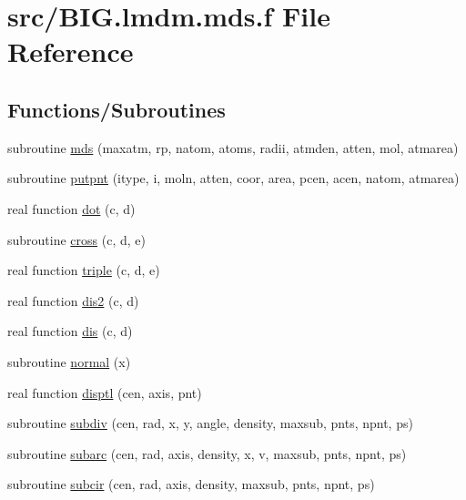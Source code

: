 \hypertarget{_b_i_g_8lmdm_8mds_8f}{}\section{src/\+B\+I\+G.lmdm.\+mds.\+f File Reference}
\label{_b_i_g_8lmdm_8mds_8f}
\subsection*{Functions/\+Subroutines}
\begin{DoxyCompactItemize}
\item 
subroutine \hyperlink{_b_i_g_8lmdm_8mds_8f_aa81f9e2405716814317f319fe16aabf3}{mds} (maxatm, rp, natom, atoms, radii, atmden, atten, mol, atmarea)
\item 
subroutine \hyperlink{_b_i_g_8lmdm_8mds_8f_abe5d23f06aa6cacf4afa05316bab2b62}{putpnt} (itype, i, moln, atten, coor, area, pcen, acen, natom, atmarea)
\item 
real function \hyperlink{_b_i_g_8lmdm_8mds_8f_ae601373f8acae350412756b81d7274c6}{dot} (c, d)
\item 
subroutine \hyperlink{_b_i_g_8lmdm_8mds_8f_ac8fc253e71c54239b8fdeca12294dc5c}{cross} (c, d, e)
\item 
real function \hyperlink{_b_i_g_8lmdm_8mds_8f_a4f0dc28bb4bc5945b250816796a6393c}{triple} (c, d, e)
\item 
real function \hyperlink{_b_i_g_8lmdm_8mds_8f_a0bbe4edf805497daf7eb55647f0e5463}{dis2} (c, d)
\item 
real function \hyperlink{_b_i_g_8lmdm_8mds_8f_a01231839cc4a4124a635ad9d120126a6}{dis} (c, d)
\item 
subroutine \hyperlink{_b_i_g_8lmdm_8mds_8f_a104a2973a06ccc713e06d9f6cb97874e}{normal} (x)
\item 
real function \hyperlink{_b_i_g_8lmdm_8mds_8f_a4e9fa2843ce6a1ff87a65c5b8e014c60}{disptl} (cen, axis, pnt)
\item 
subroutine \hyperlink{_b_i_g_8lmdm_8mds_8f_aede2b2a740b771fe587f556209c97414}{subdiv} (cen, rad, x, y, angle, density, maxsub, pnts,                   npnt, ps)
\item 
subroutine \hyperlink{_b_i_g_8lmdm_8mds_8f_ad6dfe437b099fa551d05e784b5c7afcd}{subarc} (cen, rad, axis, density, x, v, maxsub, pnts,                   npnt, ps)
\item 
subroutine \hyperlink{_b_i_g_8lmdm_8mds_8f_a4957fbd7ab497fae37c246c1ae6d6f86}{subcir} (cen, rad, axis, density, maxsub, pnts, npnt,                   ps)
\end{DoxyCompactItemize}


